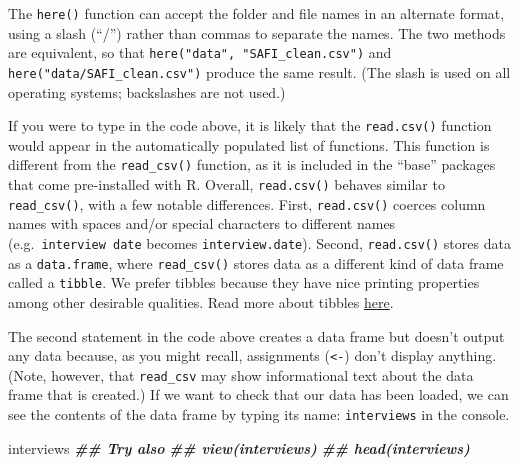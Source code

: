 \documentclass[
]{article}
\newenvironment{Shaded}{\begin{snugshade}}{\end{snugshade}}
\newcommand{\DocumentationTok}[1]{\textcolor[rgb]{0.56,0.35,0.01}{\textbf{\textit{#1}}}}
\newcommand{\NormalTok}[1]{#1}
\begin{document}
The \texttt{here()} function can accept the folder and file names in an
alternate format, using a slash (``/'') rather than commas to separate
the names. The two methods are equivalent, so that
\texttt{here("data",\ "SAFI\_clean.csv")} and
\texttt{here("data/SAFI\_clean.csv")} produce the same result. (The
slash is used on all operating systems; backslashes are not used.)

If you were to type in the code above, it is likely that the
\texttt{read.csv()} function would appear in the automatically populated
list of functions. This function is different from the
\texttt{read\_csv()} function, as it is included in the ``base''
packages that come pre-installed with R. Overall, \texttt{read.csv()}
behaves similar to \texttt{read\_csv()}, with a few notable differences.
First, \texttt{read.csv()} coerces column names with spaces and/or
special characters to different names (e.g.~\texttt{interview\ date}
becomes \texttt{interview.date}). Second, \texttt{read.csv()} stores
data as a \texttt{data.frame}, where \texttt{read\_csv()} stores data as
a different kind of data frame called a \texttt{tibble}. We prefer
tibbles because they have nice printing properties among other desirable
qualities. Read more about tibbles
\href{https://tibble.tidyverse.org/}{here}.

The second statement in the code above creates a data frame but doesn't
output any data because, as you might recall, assignments
(\texttt{\textless{}-}) don't display anything. (Note, however, that
\texttt{read\_csv} may show informational text about the data frame that
is created.) If we want to check that our data has been loaded, we can
see the contents of the data frame by typing its name:
\texttt{interviews} in the console.

\begin{Shaded}
\begin{Highlighting}[]
\NormalTok{interviews}
\DocumentationTok{\#\# Try also}
\DocumentationTok{\#\# view(interviews)}
\DocumentationTok{\#\# head(interviews)}
\end{Highlighting}
\end{Shaded}
\end{document}
